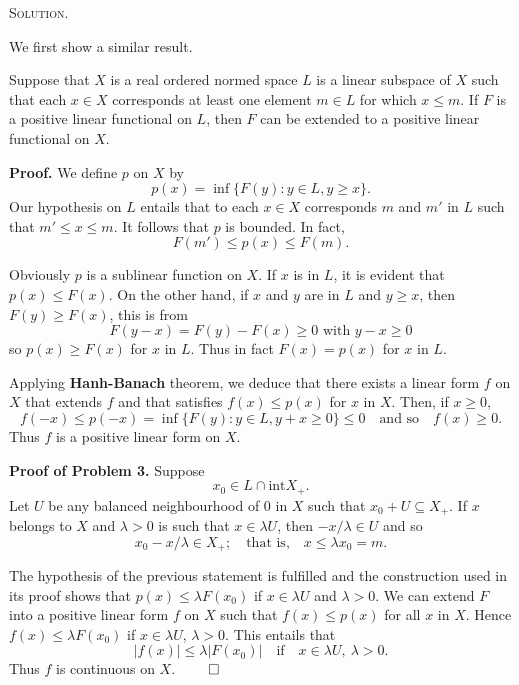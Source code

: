 \documentclass[12pt, a4paper, oneside]{ctexart}
\newenvironment{solution}{%
	\par\noindent\textsc{Solution. }\ignorespaces
}{%
	\hfill$\qed$\par
}
\begin{document}
	\begin{solution}
		We first show a similar result.
		\begin{framed}
			Suppose that \( X \) is a real ordered normed space \( L \) is a linear subspace of \( X \) such that each $x\in X$ corresponds at least one element $m\in L$ for which $x\leq m$. If $F$ is a positive linear functional on $L$, then $F$ can be extended to a positive linear functional on $X$. 
		\end{framed}
		\textbf{Proof.} We define \( p \) on \( X \) by  
		\[
		p(x) = \inf \{F(y): y \in L, y \geq x\}.
		\]  
		Our hypothesis on \( L \) entails that to each \( x \in X \) corresponds \( m \) and \( m' \) in \( L \) such that \( m' \leq x \leq m \). It follows that \( p \) is bounded. In fact,  
		\[
		F(m') \leq p(x) \leq F(m).
		\]  
		
		Obviously \( p \) is a sublinear function on \( X \). If \( x \) is in \( L \), it is evident that \( p(x) \leq F(x) \). On the other hand, if \( x \) and \( y \) are in \( L \) and \( y \geq x \), then \( F(y) \geq F(x) \), this is from \[ F(y-x) = F(y) - F(x)\geq 0 \text{ with } y-x\geq0 \] so \( p(x) \geq F(x) \) for \( x \) in \( L \).  
		Thus in fact \( F(x) = p(x) \) for \( x \) in \( L \).  
		
		Applying \textbf{Hanh-Banach} theorem, we deduce that there exists a linear form \( f \) on \( X \) that extends \( f \) and that satisfies \( f(x) \leq p(x) \) for \( x \) in \( X \). Then, if \( x \geq 0 \),  
		\[
		f(-x) \leq p(-x) = \inf \{F(y): y \in L, y + x \geq 0\} \leq 0 \quad \text{and so} \quad f(x) \geq 0.
		\]
		Thus \( f \) is a positive linear form on \( X \).
		
		\textbf{Proof of Problem 3.} Suppose \[
		x_{0} \in L \cap \text{int} X_+ .
		\]Let \( U \) be any balanced neighbourhood of \( 0 \) in \( X \) such that \( x_0 + U \subseteq X_{+} \).  
		If \( x \) belongs to \( X \) and \( \lambda > 0 \) is such that \( x \in \lambda U \), then \( -x / \lambda \in U \) and so  
		\[
		x_0 - x / \lambda \in X_{+}; \quad \text{that is,} \quad x \leq \lambda x_0 = m.
		\]  
		
		The hypothesis of the previous statement is fulfilled and the construction used in its proof shows that \( p(x) \leq \lambda F(x_0) \) if \( x \in \lambda U \) and \( \lambda > 0 \).  
		We can extend \( F \) into a positive linear form \( f \) on \( X \) such that \( f(x) \leq p(x) \) for all \( x \) in \( X \). Hence \( f(x) \leq \lambda F(x_0) \) if \( x \in \lambda U \), \( \lambda > 0 \).  
			This entails that  
		\[
		|f(x)| \leq \lambda |F(x_0)| \quad \text{if} \quad x \in \lambda U, \ \lambda > 0.
		\]
		Thus \( f \) is continuous on \( X \).
	\end{solution}
	
\end{document}
